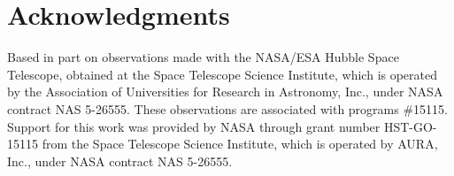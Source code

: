 \documentclass[apj]{emulateapj}
\begin{document}


%

\clearpage
\section*{Acknowledgments}
Based in part on observations made with the NASA/ESA Hubble Space Telescope, obtained at the Space Telescope Science Institute, which is operated by the Association of Universities for Research in Astronomy, Inc., under NASA contract NAS 5-26555. These observations are associated with programs
\#15115. Support for this work was provided by NASA through grant number HST-GO-15115 from the Space Telescope Science Institute, which is operated by AURA, Inc., under NASA contract NAS 5-26555.

\end{document}
